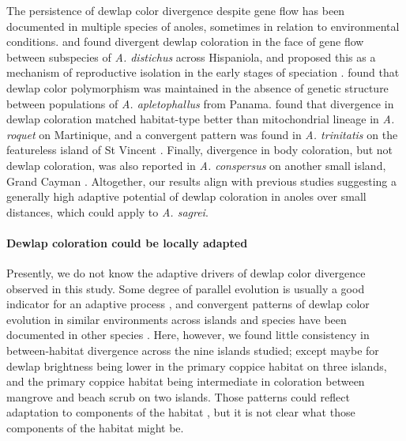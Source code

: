 The persistence of dewlap color divergence despite gene flow has been documented in multiple species of anoles, sometimes in relation to environmental conditions. \citet{Ng2012} and \citet{Ng2016} found divergent dewlap coloration in the face of gene flow between subspecies of \textit{A. distichus} across Hispaniola, and proposed this as a mechanism of reproductive isolation in the early stages of speciation \citep{Ng2011, Lambert2013, Ng2017}. \citet{Stapley2011} found that dewlap color polymorphism was maintained in the absence of genetic structure between populations of \textit{A. apletophallus} from Panama. \citet{Thorpe2002a} found that divergence in dewlap coloration matched habitat-type better than mitochondrial lineage in \textit{A. roquet} on Martinique, and a convergent pattern was found in \textit{A. trinitatis} on the featureless island of St Vincent \citep{Thorpe2002b}. Finally, divergence in body coloration, but not dewlap coloration, was also reported in \textit{A. conspersus} on another small island, Grand Cayman \citep{Macedonia2001}. Altogether, our results align with previous studies suggesting a generally high adaptive potential of dewlap coloration in anoles over small distances, which could apply to \textit{A. sagrei}.


\paragraph{Dewlap coloration could be locally adapted} Presently, we do not know the adaptive drivers of dewlap color divergence observed in this study. Some degree of parallel evolution is usually a good indicator for an adaptive process \citep{Losos2011}, and convergent patterns of dewlap color evolution in similar environments across islands and species have been documented in other species \citep{Thorpe2002a, Thorpe2002b}. Here, however, we found little consistency in between-habitat divergence across the nine islands studied; except maybe for dewlap brightness being lower in the primary coppice habitat on three islands, and the primary coppice habitat being intermediate in coloration between mangrove and beach scrub on two islands. Those patterns could reflect adaptation to components of the habitat \citep{Endler1988}, but it is not clear what those components of the habitat might be.\\

